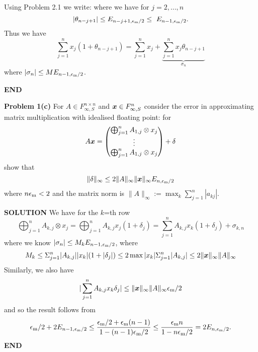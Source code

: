\documentclass[12pt,a4paper]{article}
\def\x{ {\vc x} }
\begin{document}
Using Problem 2.1 we write:
where we have for $j = 2,\ensuremath{\ldots},n$
\[
|\ensuremath{\theta}_{n-j+1}| \ensuremath{\leq} E_{n-j+1,\ensuremath{\epsilon}_{\rm m}/2} \ensuremath{\leq} E_{n-1,\ensuremath{\epsilon}_{\rm m}/2}.
\]
Thus we have 
\[
\ensuremath{\sum}_{j=1}^n x_j (1 + \ensuremath{\theta}_{n-j+1})= \ensuremath{\sum}_{j=1}^n x_j + \underbrace{\ensuremath{\sum}_{j=1}^n x_j \ensuremath{\theta}_{n-j+1}}_{\ensuremath{\sigma}_n}
\]
where $|\ensuremath{\sigma}_n| \ensuremath{\leq} M E_{n-1,\ensuremath{\epsilon}_{\rm m}/2}$.

\textbf{END}

\textbf{Problem 1(c)} For $A \ensuremath{\in} F_{\ensuremath{\infty},S}^{n \ensuremath{\times} n}$ and $\ensuremath{\bm{\x}} \ensuremath{\in} F_{\ensuremath{\infty},S}^n$ consider the error in approximating matrix multiplication with idealised floating point: for
\[
A \ensuremath{\bm{\x}} =  \begin{pmatrix}
\ensuremath{\bigoplus}_{j=1}^n A_{1,j} \ensuremath{\otimes} x_j\\
\ensuremath{\vdots} \\
\ensuremath{\bigoplus}_{j=1}^n A_{1,j} \ensuremath{\otimes} x_j
\end{pmatrix} + \ensuremath{\delta}
\]
show that
\[
\| \ensuremath{\delta} \|_\ensuremath{\infty} \ensuremath{\leq} 2 \|A\|_\ensuremath{\infty} \| \ensuremath{\bm{\x}} \|_\ensuremath{\infty} E_{n,\ensuremath{\epsilon}_{\rm m}/2}
\]
where  $n \ensuremath{\epsilon}_{\rm m} < 2$ and the matrix norm is $\|A \|_\ensuremath{\infty} := \max_k \ensuremath{\sum}_{j=1}^n |a_{kj}|$.

\textbf{SOLUTION} We have for the $k$=th row
\[
\ensuremath{\bigoplus}_{j=1}^n A_{k,j} \ensuremath{\otimes} x_j =  \ensuremath{\bigoplus}_{j=1}^n A_{k,j} x_j (1+\ensuremath{\delta}_j) = 
\ensuremath{\sum}_{j=1}^n A_{k,j} x_k (1+\ensuremath{\delta}_j) + \ensuremath{\sigma}_{k,n}
\]
where we know $|\ensuremath{\sigma}_n| \ensuremath{\leq} M_k E_{n-1,\ensuremath{\epsilon}_{\rm m}/2}$, where
\[
M_k \ensuremath{\leq} \ensuremath{\Sigma}_{j=1}^n |A_{k,j}| |x_k| (1+|\ensuremath{\delta}_j|)  \ensuremath{\leq} 2 \max |x_k| \ensuremath{\Sigma}_{j=1}^n |A_{k,j}|
\ensuremath{\leq} 2 \|\ensuremath{\bm{\x}}\|_\ensuremath{\infty} \|A \|_\ensuremath{\infty}
\]
Similarly, we also have 
\[
|\ensuremath{\sum}_{j=1}^n A_{k,j} x_k \ensuremath{\delta}_j| \ensuremath{\leq} \|\ensuremath{\bm{\x}}\|_\ensuremath{\infty} \|A \|_\ensuremath{\infty} \ensuremath{\epsilon}_{\rm m}/2
\]
and so the result follows from
\[
\ensuremath{\epsilon}_{\rm m}/2 + 2E_{n-1,\ensuremath{\epsilon}_{\rm m}/2} \ensuremath{\leq} {\ensuremath{\epsilon}_{\rm m}/2 + \ensuremath{\epsilon}_{\rm m} (n-1) \over 1-(n-1)\ensuremath{\epsilon}_{\rm m}/2} \ensuremath{\leq} {\ensuremath{\epsilon}_{\rm m} n \over 1-n\ensuremath{\epsilon}_{\rm m}/2} = 2E_{n,\ensuremath{\epsilon}_{\rm m}/2}.
\]
\textbf{END}
\end{document}
